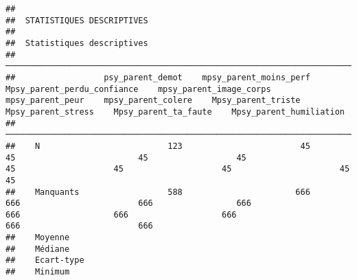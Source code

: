 \documentclass[
]{article}
\begin{document}
\begin{verbatim}
## 
##  STATISTIQUES DESCRIPTIVES
## 
##  Statistiques descriptives                                                                                                                                                                                                                                       
##  ─────────────────────────────────────────────────────────────────────────────────────────────────────────────────────────────────────────────────────────────────────────────────────────────────────────────────────────────────────────────────────────────── 
##                  psy_parent_demot    mpsy_parent_moins_perf    Mpsy_parent_perdu_confiance    mpsy_parent_image_corps    mpsy_parent_peur    mpsy_parent_colere    Mpsy_parent_triste    Mpsy_parent_stress    Mpsy_parent_ta_faute    Mpsy_parent_humiliation   
##  ─────────────────────────────────────────────────────────────────────────────────────────────────────────────────────────────────────────────────────────────────────────────────────────────────────────────────────────────────────────────────────────────── 
##    N                          123                        45                             45                         45                  45                    45                    45                    45                      45                         45   
##    Manquants                  588                       666                            666                        666                 666                   666                   666                   666                     666                        666   
##    Moyenne                                                                                                                                                                                                                                                       
##    Médiane                                                                                                                                                                                                                                                       
##    Ecart-type                                                                                                                                                                                                                                                    
##    Minimum                                                                                                                                                                                                                                                       

\end{verbatim}
\end{document}
